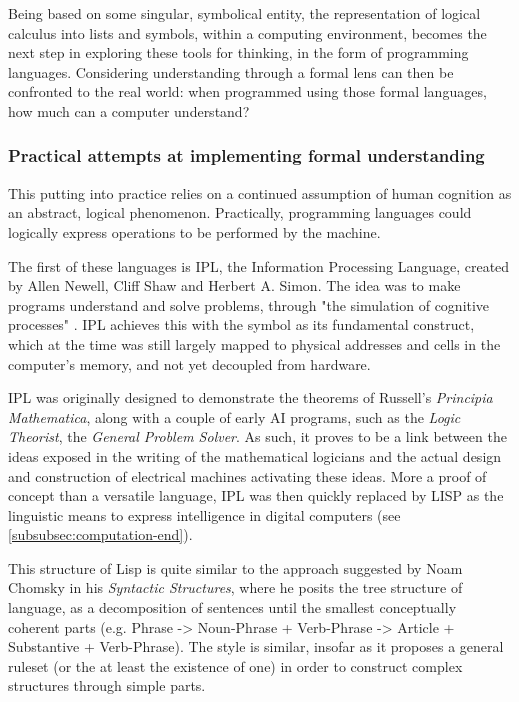 Being based on some singular, symbolical entity, the representation of logical calculus into lists and symbols, within a computing environment, becomes the next step in exploring these tools for thinking, in the form of programming languages. Considering understanding through a formal lens can then be confronted to the real world: when programmed using those formal languages, how much can a computer understand?

\subsubsection{Practical attempts at implementing formal understanding}
\label{subsubsec:practical-understanding}

This putting into practice relies on a continued assumption of human cognition as an abstract, logical phenomenon. Practically, programming languages could logically express operations to be performed by the machine.

The first of these languages is IPL, the Information Processing Language, created by Allen Newell, Cliff Shaw and Herbert A. Simon.  The idea was to make programs understand and solve problems, through "the simulation of cognitive processes" \citep{newell_information_1964}. IPL achieves this with the symbol as its fundamental construct, which at the time was still largely mapped to physical addresses and cells in the computer's memory, and not yet decoupled from hardware.

IPL was originally designed to demonstrate the theorems of Russell's \emph{Principia Mathematica}, along with a couple of early AI programs, such as the \emph{Logic Theorist}, the \emph{General Problem Solver}. As such, it proves to be a link between the ideas exposed in the writing of the mathematical logicians and the actual design and construction of electrical machines activating these ideas. More a proof of concept than a versatile language, IPL was then quickly replaced by LISP as the linguistic means to express intelligence in digital computers (see \ref{subsubsec:computation-end}).

This structure of Lisp is quite similar to the approach suggested by Noam Chomsky in his \emph{Syntactic Structures}, where he posits the tree structure of language, as a decomposition of sentences until the smallest conceptually coherent parts (e.g. Phrase -> Noun-Phrase + Verb-Phrase -> Article + Substantive + Verb-Phrase). The style is similar, insofar as it proposes a general ruleset (or the at least the existence of one) in order to construct complex structures through simple parts.

